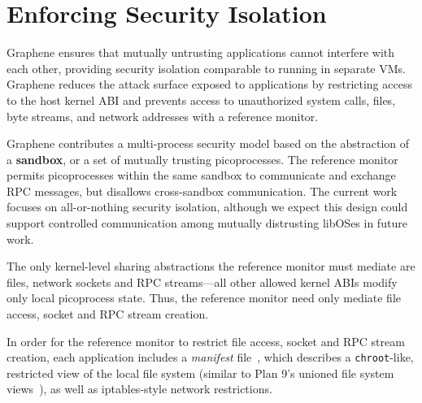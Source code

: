 \section{Enforcing Security Isolation}
\label{sec:security}
\label{sec:syscall-restrict}

Graphene ensures that mutually untrusting applications 
cannot interfere with each other, providing security isolation
comparable to running in separate VMs.
Graphene reduces the attack surface exposed to applications
by restricting access to the host kernel ABI 
and prevents access to unauthorized system calls, files, byte streams,
and network addresses with a reference monitor.

Graphene contributes a multi-process security model 
based on the abstraction of a {\bf sandbox},
or a set of mutually trusting picoprocesses.
The reference monitor permits picoprocesses within the same sandbox
to communicate and exchange RPC messages, but disallows cross-sandbox communication.
The current work focuses on all-or-nothing security isolation, although we expect
this design could support
controlled communication among mutually distrusting libOSes
in future work.


The only kernel-level sharing abstractions the reference monitor must mediate
are files, network sockets and RPC streams---all other allowed kernel ABIs
modify only local picoprocess state.
Thus, the reference monitor need only mediate file access, socket and RPC stream creation.


In order for the reference monitor to restrict file access, socket and RPC stream creation,
each application includes a {\em manifest} file~\citep{hunt07rethink},
which describes a {\tt chroot}-like, restricted view of the local 
file system (similar to Plan 9's unioned file system views~\citep{pike90plan9}),
as well as iptables-style network restrictions.


